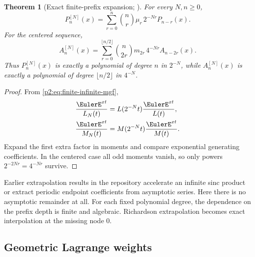 \documentclass[11pt,oneside]{article}
\numberwithin{equation}{section}
\newtheorem{theorem}{Theorem}[section]
\theoremstyle{definition}
\theoremstyle{remark}
\begin{document}
\begin{theorem}[Exact finite-prefix expansion; \statusnew]
\label{p2:thm:finite-prefix-expansion}
For every $N,n\ge0$,
\begin{equation}
 \boxed{
 P_n^{[N]}(x)
 =\sum_{r=0}^{n}\binom nr\mu_r\,2^{-Nr}P_{n-r}(x).
 }
 \label{p2:eq:P-prefix-expansion}
\end{equation}
For the centered sequence,
\begin{equation}
 \boxed{
 A_n^{[N]}(x)
 =\sum_{r=0}^{\lfloor n/2\rfloor}
 \binom n{2r}m_{2r}\,4^{-Nr}A_{n-2r}(x).
 }
 \label{p2:eq:A-prefix-expansion}
\end{equation}
Thus $P_n^{[N]}(x)$ is exactly a polynomial of degree $n$ in $2^{-N}$, while
$A_n^{[N]}(x)$ is exactly a polynomial of degree $\lfloor n/2\rfloor$ in $4^{-N}$.
\end{theorem}

\begin{proof}
From \eqref{p2:eq:finite-infinite-mgf},
\begin{align*}
 \frac{\EulerE^{xt}}{L_N(t)}
 &=L(2^{-N}t)\frac{\EulerE^{xt}}{L(t)},\\
 \frac{\EulerE^{xt}}{M_N(t)}
 &=M(2^{-N}t)\frac{\EulerE^{xt}}{M(t)}.
\end{align*}
Expand the first extra factor in moments and compare exponential generating coefficients.  In the
centered case all odd moments vanish, so only powers $2^{-2Nr}=4^{-Nr}$ survive.
\end{proof}

\begin{remark}
Earlier extrapolation results in the repository accelerate an infinite sinc product or extract
periodic endpoint coefficients from asymptotic series.  Here there is no asymptotic remainder at
all.  For each fixed polynomial degree, the dependence on the prefix depth is finite and algebraic.
Richardson extrapolation becomes exact interpolation at the missing node $0$.
\end{remark}

\subsection{Geometric Lagrange weights}
\end{document}
